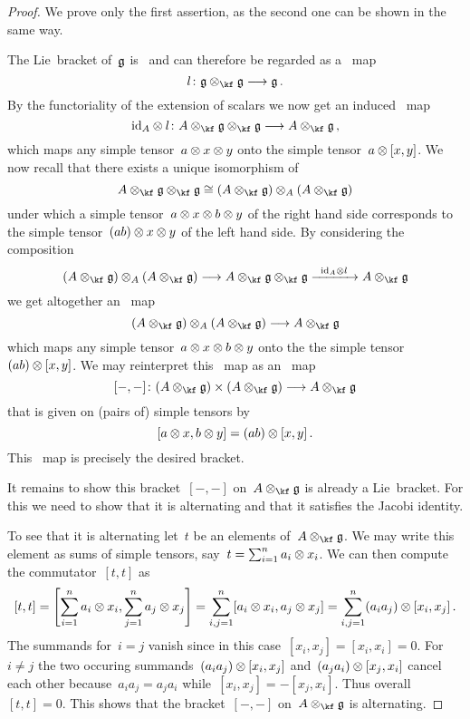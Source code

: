 \begin{proof}
  We prove only the first assertion, as the second one can be shown in the same way.

  The Lie~bracket of~$\mathfrak{g}$ is~\bilinear{$\kf$} and can therefore be regarded as a~\linear{$\kf$} map
  \[
    l \colon \glie \tensor_{\kf} \glie \to \glie \,.
  \]
  By the functoriality of the extension of scalars we now get an induced~ map
  \[
    \id_A \tensor l
    \colon
    A \tensor_{\kf} \glie \tensor_{\kf} \glie
    \to
    A \tensor_{\kf} \glie \,,
  \]
  which maps any simple tensor~$a \otimes x \otimes y$ onto the simple tensor~$a \otimes [x,y]$.
  We now recall that there exists a unique isomorphism of~
  \[
    A \tensor_{\kf} \glie \tensor_{\kf} \glie
    \cong
    ( A \tensor_{\kf} \glie ) \tensor_A ( A \tensor_{\kf} \glie )
  \]
  under which a simple tensor~$a \otimes x \otimes b \otimes y$ of the right hand side corresponds to the simple tensor~$(ab) \otimes x \otimes y$ of the left hand side.
  By considering the composition
  \[
    (A \tensor_{\kf} \glie) \tensor_A (A \tensor_{\kf} \glie)
    \to
    A \otimes_{\kf} \glie \otimes_{\kf} \glie
    \xto{\id_A \otimes l}
    A \tensor_{\kf} \glie
  \]
  we get altogether an~{} map
  \[
    (A \tensor_{\kf} \glie) \tensor_A (A \tensor_{\kf} \glie)
    \to
    A \tensor_{\kf} \glie
  \]
  which maps any simple tensor~$a \otimes x \otimes b \otimes y$ onto the the simple tensor~$(ab) \otimes [x,y]$.
  We may reinterpret this~ map as an~ map
  \[
    [-,-]
    \colon
    (A \tensor_{\kf} \glie) \times (A \tensor_{\kf} \glie)
    \to
    A \tensor_{\kf} \glie
  \]
  that is given on (pairs of) simple tensors by
  \[
    [a \otimes x, b \otimes y]
    =
    (ab) \otimes [x,y] \,.
  \]
  This~ map is precisely the desired bracket.

  It remains to show this bracket~$[-,-]$ on~$A \tensor_{\kf} \glie$ is already a Lie~bracket.
  For this we need to show that it is alternating and that it satisfies the Jacobi identity.

  To see that it is alternating let~$t$ be an elements of~$A \tensor_{\kf} \glie$.
  We may write this element as sums of simple tensors, say~$t = \sum_{i=1}^n a_i \otimes x_i$.
  We can then compute the commutator~$[t, t]$ as
  \[
    [t, t]
    =
    \Biggl[
      \sum_{i=1}^n a_i \otimes x_i,
      \sum_{j=1}^n a_j \otimes x_j
    \Biggr]
    =
    \sum_{i, j = 1}^n
    [ a_i \otimes x_i, a_j \otimes x_j ]
    =
    \sum_{i, j = 1}^n
    ( a_i a_j ) \otimes [ x_i, x_j ] \,.
  \]
  The summands for~$i = j$ vanish since in this case~$[x_i, x_j] = [x_i, x_i] = 0$.
  For~$i \neq j$ the two occuring summands~$(a_i a_j) \otimes [x_i, x_j]$ and~$(a_j a_i) \otimes [x_j, x_i]$ cancel each other because~$a_i a_j = a_j a_i$ while~$[x_i, x_j] = -[x_j, x_i]$.
  Thus overall~$[t, t] = 0$.
  This shows that the bracket~$[-,-]$ on~$A \tensor_{\kf} \glie$ is alternating.


\end{proof}
